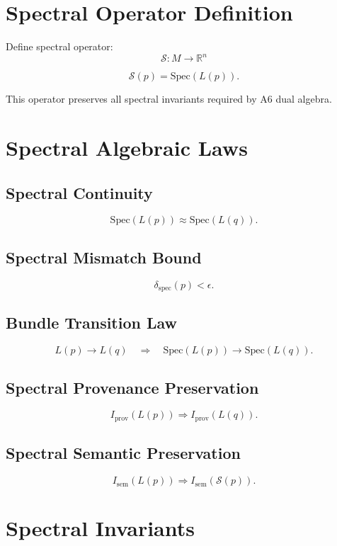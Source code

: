 \documentclass[11pt]{article}
\begin{document}
\section{Spectral Operator Definition}

Define spectral operator:
\[
\mathcal{S} : M \to \mathbb{R}^n
\]

\[
\mathcal{S}(p) = \mathrm{Spec}(L(p)).
\]

This operator preserves all spectral invariants required by A6 dual algebra.

\section{Spectral Algebraic Laws}

\subsection{Spectral Continuity}
\[
\mathrm{Spec}(L(p)) \approx \mathrm{Spec}(L(q)).
\]

\subsection{Spectral Mismatch Bound}
\[
\delta_{\mathrm{spec}}(p) < \epsilon.
\]

\subsection{Bundle Transition Law}
\[
L(p) \to L(q) \quad \Rightarrow \quad \mathrm{Spec}(L(p)) \to \mathrm{Spec}(L(q)).
\]

\subsection{Spectral Provenance Preservation}
\[
I_{\mathrm{prov}}(L(p)) \Rightarrow I_{\mathrm{prov}}(L(q)).
\]

\subsection{Spectral Semantic Preservation}
\[
I_{\mathrm{sem}}(L(p)) \Rightarrow I_{\mathrm{sem}}(\mathcal{S}(p)).
\]

\section{Spectral Invariants}
\end{document}
